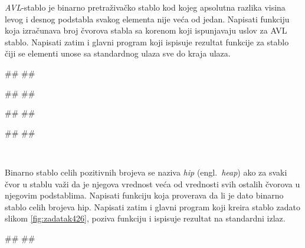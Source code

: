 \begin{Exercise}[label=4_25]
\emph{AVL}-stablo je binarno pretraživačko stablo kod kojeg apsolutna razlika visina levog i desnog podstabla svakog elementa nije veća od jedan. Napisati funkciju  koja izračunava broj čvorova stabla sa korenom  koji ispunjavaju uslov za AVL stablo. Napisati zatim i glavni program koji ispisuje rezultat  funkcije za stablo čiji se elementi unose sa standardnog ulaza sve do kraja ulaza. \\

\begin{miditest}
\begin{test}{1}
#\naslovUlaz#
##

#\naslovIzlaz#
##
\end{test}
\end{miditest}
\begin{miditest}
\begin{test}{2}
#\naslovUlaz#
##

#\naslovIzlaz#
##
\end{test}
\end{miditest}
\end{Exercise}

\begin{Answer}[ref=4_25]
\\
\end{Answer}


\begin{Exercise}[label=4_26]
Binarno stablo celih pozitivnih brojeva se naziva \emph{hip} (engl.~{\em heap}) ako za svaki čvor u stablu važi da je njegova vrednost veća od vrednosti svih ostalih čvorova u njegovim podstablima. Napisati funkciju  koja proverava da li je dato binarno stablo celih brojeva hip. Napisati zatim i glavni program koji kreira stablo zadato slikom \ref{fig:zadatak426}, poziva funkciju  i ispisuje rezultat na standardni izlaz. \\

\begin{miditest}
\begin{test}{1}
#\naslovIzlaz#
##
\end{test}
\end{miditest}
\end{Exercise}

